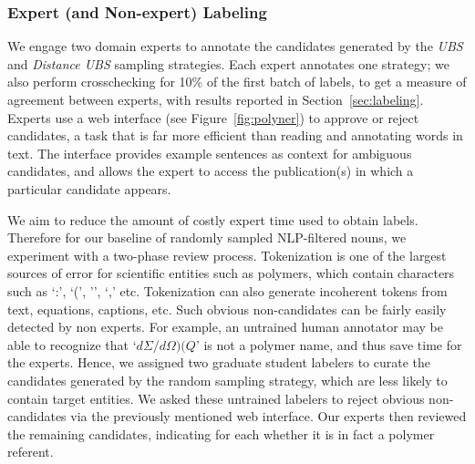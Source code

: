 \subsubsection{Expert (and Non-expert) Labeling}
We engage two domain experts to annotate the candidates generated by the 
\textit{UBS} and \textit{Distance UBS} sampling strategies. 
Each expert annotates one strategy;
we also perform crosschecking for 10\% of the first batch of labels, to get a measure of agreement between experts,
with results reported in Section~\ref{sec:labeling}. 
Experts use a web interface (see Figure~\ref{fig:polyner}) to approve or reject candidates,
a task that is far more efficient than reading and annotating words in text.
The interface
provides example sentences as context for ambiguous candidates,
and allows the expert to access the publication(s) in which a particular candidate
appears. %

We aim to reduce the amount of costly expert time used to obtain labels.
Therefore for our baseline of randomly sampled NLP-filtered nouns, we experiment with a two-phase review process.
Tokenization is one of the largest sources of error for scientific entities such as polymers, 
which contain characters such as `:', `(',
'\textendash', `,' etc. 
Tokenization can also generate incoherent tokens from text, equations, captions, etc.
Such obvious non-candidates can be fairly easily detected by non experts.
For example, an untrained human annotator may be able to recognize that `$d\Sigma/d\Omega)(Q$' is not a polymer name, and thus save time for the experts.
Hence, we assigned two graduate student labelers to curate the candidates generated by the random sampling strategy, which are less likely to contain target entities.
We asked these untrained labelers to reject obvious non-candidates via the previously mentioned web interface. 
Our experts then reviewed the remaining
candidates, indicating for each whether it is in fact a polymer referent. %



